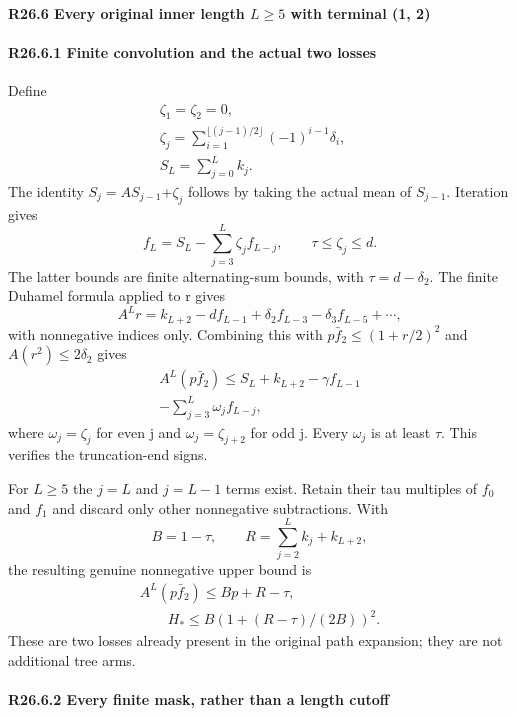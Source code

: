 \paragraph{R26.6 Every original inner length \(L\ge 5\) with terminal (1, 2)}

\paragraph{R26.6.1 Finite convolution and the actual two losses}

Define
\[
\begin{gathered}
\zeta_1=\zeta_2=0,\quad\\
\zeta_j=\sum_{i=1}^{\lfloor(j-1)/2\rfloor}(-1)^{i-1}\delta_i,\quad\\
S_L=\sum_{j=0}^Lk_j.
\end{gathered}
\]
The identity \(S_j=A S_{j-1}\)+\(\zeta_j\) follows by taking the actual mean of
\(S_{j-1}\). Iteration gives
\[
f_L=S_L-\sum_{j=3}^L\zeta_jf_{L-j},\qquad
\tau\le\zeta_j\le d.
\]
The latter bounds are finite alternating-sum bounds, with \(\tau=d-\delta_2.\)
The finite Duhamel formula applied to r gives
\[
A^Lr=k_{L+2}-df_{L-1}+\delta_2f_{L-3}-\delta_3f_{L-5}+\cdots,
\]
with nonnegative indices only. Combining this with \(p\bar f_2\le (1+r/2)^2\)
and \(A(r^2)\le 2\delta_2\) gives
\[
\begin{gathered}
A^L(p\bar f_2)\le S_L+k_{L+2}-\gamma f_{L-1}\\
-\sum_{j=3}^L\omega_jf_{L-j},
\end{gathered}\tag{R26.A.18}
\]
where \(\omega_j=\zeta_j\) for even j and \(\omega_j= \zeta_{j+2}\) for odd j.
Every \(\omega_j\) is at least \(\tau\). This verifies the truncation-end signs.

For \(L\ge 5\) the \(j=L\) and \(j=L-1\) terms exist. Retain their tau multiples of
\(f_0\) and \(f_1\) and discard only other nonnegative subtractions. With
\[
B=1-\tau,\qquad R=\sum_{j=2}^Lk_j+k_{L+2},
\]
the resulting genuine nonnegative upper bound is
\[
\begin{gathered}
A^L(p\bar f_2)\le Bp+R-\tau,\\
\qquad H_*\le B(1+(R-\tau)/(2B))^2.
\end{gathered}\tag{R26.A.19}
\]
These are two losses already present in the original path expansion;
they are not additional tree arms.

\paragraph{R26.6.2 Every finite mask, rather than a length cutoff}


